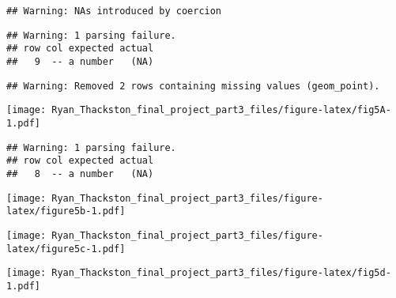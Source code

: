 \documentclass[
]{article}
\begin{document}
\begin{verbatim}
## Warning: NAs introduced by coercion
\end{verbatim}

\begin{verbatim}
## Warning: 1 parsing failure.
## row col expected actual
##   9  -- a number   (NA)
\end{verbatim}

\begin{verbatim}
## Warning: Removed 2 rows containing missing values (geom_point).
\end{verbatim}

\texttt{[image: Ryan\_Thackston\_final\_project\_part3\_files/figure-latex/fig5A-1.pdf]}

\begin{verbatim}
## Warning: 1 parsing failure.
## row col expected actual
##   8  -- a number   (NA)
\end{verbatim}

\texttt{[image: Ryan\_Thackston\_final\_project\_part3\_files/figure-latex/figure5b-1.pdf]}

\texttt{[image: Ryan\_Thackston\_final\_project\_part3\_files/figure-latex/figure5c-1.pdf]}

\texttt{[image: Ryan\_Thackston\_final\_project\_part3\_files/figure-latex/fig5d-1.pdf]}
\end{document}
